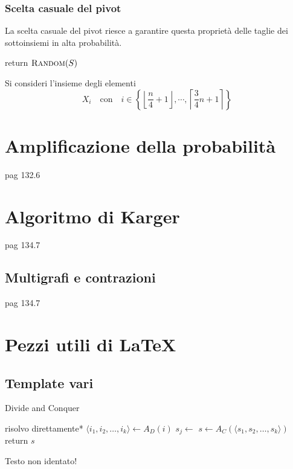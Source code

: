 \subsubsection{Scelta casuale del pivot}

La scelta casuale del pivot riesce a garantire questa proprietà delle taglie dei sottoinsiemi in alta probabilità.
\begin{algorithmic}[1]
        \State return $\Call{Random}{S}$
    \EndProcedure
\end{algorithmic}
Si consideri l'insieme degli elementi
\begin{equation*}
    X_i
    \quad 
    \text{con}
    \quad 
    i \in
    \left\{ 
        \left\lfloor 
        \frac{n}{4} + 1
        \right\rfloor
        , \cdots , 
        \left\lceil 
        \frac{3}{4}n + 1
        \right\rceil
    \right\}
\end{equation*}

\section{Amplificazione della probabilità}
pag 132.6

\section{Algoritmo di Karger}
pag 134.7

\subsection{Multigrafi e contrazioni}
pag 134.7

\section{Pezzi utili di \LaTeX{}}

\subsection{Template vari}

\begin{algorithm}[H]
\caption{Divide and Conquer}\label{alg:dnc}
\begin{algorithmic}[1]
            \State *risolvo direttamente*
        \EndIf
        \State $\langle i_1, i_2, \dots, i_k \rangle \gets A_D(i)$ 
            \State $s_j \gets $
        \EndFor
        \State $s \gets A_C(\langle s_1, s_2, \dots, s_k \rangle)$
        \State return $s$
    \EndProcedure
\end{algorithmic}
\end{algorithm}
\noindent
Testo non identato!

